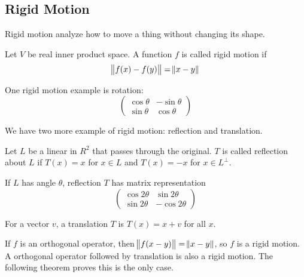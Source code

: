 \subsection{Rigid Motion}

Rigid motion analyze how to move a thing without changing its shape.

\begin{definition}
    Let $V$ be real inner product space. A function $f$ is called rigid motion if 
    \begin{equation}
        \norm{f(x) - f(y)} = \norm{x - y}
    \end{equation}
\end{definition}

One rigid motion example is rotation:
\begin{equation}
    \begin{pmatrix}
        \cos \theta & - \sin \theta \\
        \sin \theta & \cos \theta
    \end{pmatrix}
\end{equation}


We have two more example of rigid motion: reflection and translation.

\begin{definition}[Reflection]
    Let $L$ be a linear in $R^2$ that passes through the original. $T$ is called reflection about $L$ if $T(x) = x$ for $x \in L$ and $T(x) = -x$ for $x \in L^\perp$.
\end{definition}

If $L$ has angle $\theta$, reflection $T$ has matrix representation 
\begin{equation}
    \begin{pmatrix}
        \cos 2\theta & \sin 2\theta \\
        \sin 2\theta & -\cos 2\theta
    \end{pmatrix}
\end{equation}

\begin{definition}[Translation]
    For a vector $v$, a translation $T$ is $T(x) = x + v$ for all $x$.
\end{definition}

If $f$ is an orthogonal operator, then $\norm{f(x-y)} = \norm{x-y}$, so $f$ is a rigid motion. A orthogonal operator followed by translation is also a rigid motion. The following theorem proves this is the only case.


